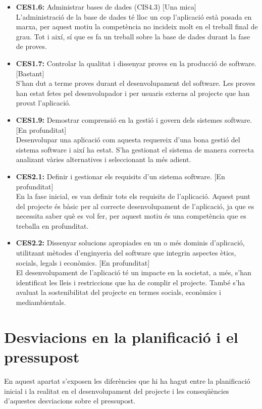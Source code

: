 \begin{itemize}
\item{}\textbf{CES1.6:} Administrar bases de dades (CIS4.3) [Una mica]\\
L'administració de la base de dades té lloc un cop l'aplicació està posada
en marxa, per aquest motiu la competència no incideix molt en el treball
final de grau. Tot i així, sí que es fa un treball sobre la base de dades durant la fase de proves.
\item{}\textbf{CES1.7:} Controlar la qualitat i dissenyar proves en la producció de software. [Bastant]\\
S'han dut a terme proves durant el desenvolupament del software. Les
proves han estat fetes pel desenvolupador i per usuaris externs al projecte
que han provat l'aplicació.
\item{}\textbf{CES1.9:} Demostrar comprensió en la gestió i govern dels sistemes software. [En profunditat]\\
Desenvolupar una aplicació com aquesta requereix d'una bona gestió del
sistema software i així ha estat. S'ha gestionat el sistema de manera correcta analizant vàries alternatives i seleccionant la més adient.
\item{}\textbf{CES2.1:} Definir i gestionar els requisits d'un sistema software. [En profunditat]\\
En la fase inicial, es van definir tots els requisits de l'aplicació. Aquest punt del projecte és bàsic per al correcte desenvolupament de l'aplicació, ja que es necessita saber què es vol fer, per aquest motiu és una competència que es treballa en profunditat.
\item{}\textbf{CES2.2:} Dissenyar solucions apropiades en un o més dominis d'aplicació, utilitzant mètodes d'enginyeria del software que integrin aspectes ètics, socials, legals i econòmics. [En profunditat]\\
El desenvolupament de l'aplicació té un impacte en la societat, a més, s'han identificat les lleis i restriccions que ha de complir el projecte. També s'ha avaluat la sostenibilitat del projecte en termes socials, econòmics i mediambientals.
\end{itemize}

\section{Desviacions en la planificació i el pressupost}

En aquest apartat s'exposen les diferències que hi ha hagut entre la planificació inicial i la realitat en el desenvolupament del projecte i les conseqüències
d'aquestes desviacions sobre el pressupost.\\

